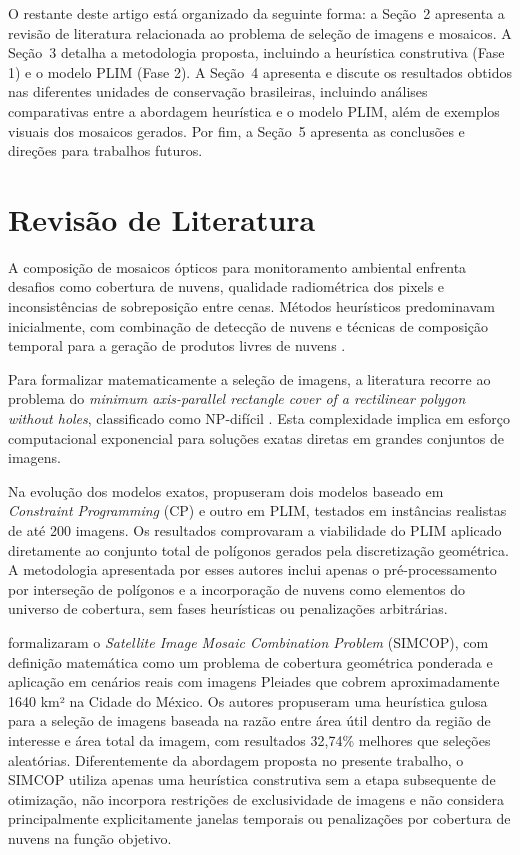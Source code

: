 \documentclass[a4paper,11pt]{article}
\begin{document}
O restante deste artigo está organizado da seguinte forma: a Seção~2 apresenta a revisão de literatura relacionada ao problema de seleção de imagens e mosaicos. A Seção~3 detalha a metodologia proposta, incluindo a heurística construtiva (Fase 1) e o modelo PLIM (Fase 2). A Seção~4 apresenta e discute os resultados obtidos nas diferentes unidades de conservação brasileiras, incluindo análises comparativas entre a abordagem heurística e o modelo PLIM, além de exemplos visuais dos mosaicos gerados. Por fim, a Seção~5 apresenta as conclusões e direções para trabalhos futuros.

\vspace{-6mm}
\section{Revisão de Literatura}
\vspace{-3mm}
A composição de mosaicos ópticos para monitoramento ambiental enfrenta desafios como cobertura de nuvens, qualidade radiométrica dos pixels e inconsistências de sobreposição entre cenas. Métodos heurísticos predominavam inicialmente, com combinação de detecção de nuvens e técnicas de composição temporal para a geração de produtos livres de nuvens \citep{kempeneers:2017}.

Para formalizar matematicamente a seleção de imagens, a literatura recorre ao problema do 
\emph{minimum axis-parallel rectangle cover of a rectilinear polygon without holes}, 
classificado como NP-difícil \citep{KumarRamesh1995, masek1978}. Esta complexidade implica em esforço computacional exponencial para soluções exatas diretas em grandes conjuntos de imagens.

Na evolução dos modelos exatos, \citet{combarro-simon-constraint-2023} propuseram dois modelos baseado em \textit{Constraint Programming} (CP) e outro em PLIM, testados em instâncias realistas de até 200 imagens. Os resultados comprovaram a viabilidade do PLIM aplicado diretamente ao conjunto total de polígonos gerados pela discretização geométrica. A metodologia apresentada por esses autores inclui apenas o pré-processamento por interseção de polígonos e a incorporação de nuvens como elementos do universo de cobertura, sem fases heurísticas ou penalizações arbitrárias.

\citet{combarro-simon-simcop:2023} formalizaram o \textit{Satellite Image Mosaic Combination Problem} (SIMCOP), com definição matemática como um problema de cobertura geométrica ponderada e aplicação em cenários reais com imagens Pleiades que cobrem aproximadamente 1640 km² na Cidade do México. Os autores propuseram uma heurística gulosa para a seleção de imagens baseada na razão entre área útil dentro da região de interesse e área total da imagem, com resultados 32,74\% melhores que seleções aleatórias. Diferentemente da abordagem proposta no presente trabalho, o SIMCOP utiliza apenas uma heurística construtiva sem a etapa subsequente de otimização, não incorpora restrições de exclusividade de imagens e não considera principalmente explicitamente janelas temporais ou penalizações por cobertura de nuvens na função objetivo.
\end{document}
